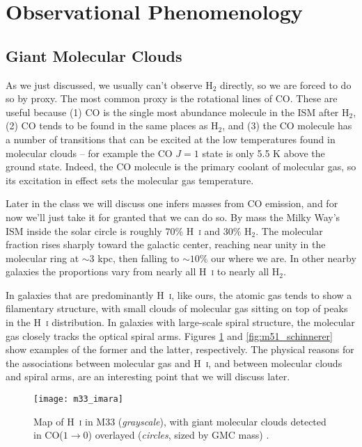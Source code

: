 \section{Observational Phenomenology}

\subsection{Giant Molecular Clouds}

As we just discussed, we usually can't observe H$_2$ directly, so we are forced to do so by proxy. The most common proxy is the rotational lines of CO. These are useful because (1) CO is the single most abundance molecule in the ISM after H$_2$, (2) CO tends to be found in the same places as H$_2$, and (3) the CO molecule has a number of transitions that can be excited at the low temperatures found in molecular clouds -- for example the CO $J=1$ state is only 5.5 K above the ground state. Indeed, the CO molecule is the primary coolant of molecular gas, so its excitation in effect sets the molecular gas temperature. 

Later in the class we will discuss one infers masses from CO emission, and for now we'll just take it for granted that we can do so. By mass the Milky Way's ISM inside the solar circle is roughly 70\% H~\textsc{i} and 30\% H$_2$. The molecular fraction rises sharply toward the galactic center, reaching near unity in the molecular ring at $\sim 3$ kpc, then falling to $\sim 10\%$ our where we are. In other nearby galaxies the proportions vary from nearly all H~\textsc{i} to nearly all H$_2$.

In galaxies that are predominantly H~\textsc{i}, like ours, the atomic gas tends to show a filamentary structure, with small clouds of molecular gas sitting on top of peaks in the H~\textsc{i} distribution. In galaxies with large-scale spiral structure, the molecular gas closely tracks the optical spiral arms. Figures \ref{fig:m33_imara} and \ref{fig:m51_schinnerer} show examples of the former and the latter, respectively. The physical reasons for the associations between molecular gas and H~\textsc{i}, and between molecular clouds and spiral arms, are an interesting point that we will discuss later. 

\begin{figure}
\texttt{[image: m33\_imara]}
\caption[Distribution of H~\textsc{i} and GMCs in M33]{
\label{fig:m33_imara}
Map of H~\textsc{i} in M33 (\textit{grayscale}), with giant molecular clouds detected in CO($1\rightarrow 0$) overlayed (\textit{circles}, sized by GMC mass) \citep{imara11b}.
}
\end{figure}

